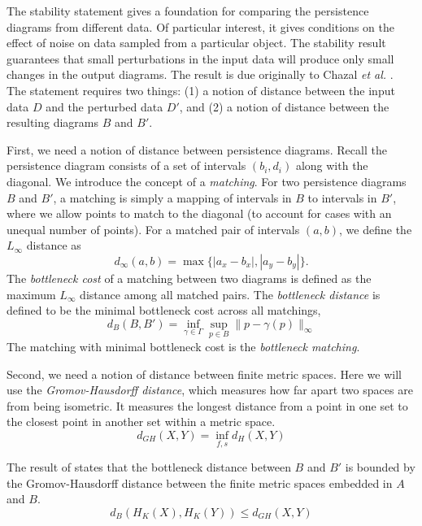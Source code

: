The stability statement gives a foundation for comparing the persistence diagrams from different data.
Of particular interest, it gives conditions on the effect of noise on data sampled from a particular object.
The stability result guarantees that small perturbations in the input data will produce only small changes in the output diagrams.
The result is due originally to Chazal \emph{et al.} \cite{Chazal:2009wc}.
The statement requires two things: (1) a notion of distance between the input data $D$ and the perturbed data $D'$, and (2) a notion of distance between the resulting diagrams $B$ and $B'$.

First, we need a notion of distance between persistence diagrams.
Recall the persistence diagram consists of a set of intervals $(b_i,d_i)$ along with the diagonal.
We introduce the concept of a \emph{matching}.
For two persistence diagrams $B$ and $B'$, a matching is simply a mapping of intervals in $B$ to intervals in $B'$, where we allow points to match to the diagonal (to account for cases with an unequal number of points).
For a matched pair of intervals $(a,b)$, we define the $L_{\infty}$ distance as
\begin{equation}
d_{\infty}(a,b) = \max\{ |a_{x}-b_{x}|, |a_{y}-b_{y}| \}.
\end{equation}
The \emph{bottleneck cost} of a matching between two diagrams is defined as the maximum $L_{\infty}$ distance among all matched pairs.
The \emph{bottleneck distance} is defined to be the minimal bottleneck cost across all matchings,
\begin{equation}
d_{B}(B,B') = \inf_{\gamma\in\Gamma}\sup_{p\in B}\|p-\gamma(p)\|_{\infty}
\end{equation}
The matching with minimal bottleneck cost is the \emph{bottleneck matching}.

Second, we need a notion of distance between finite metric spaces.
Here we will use the \emph{Gromov-Hausdorff distance}, which measures how far apart two spaces are from being isometric.
It measures the longest distance from a point in one set to the closest point in another set within a metric space.
\begin{equation}
d_{GH}(X,Y)=\inf_{f,s} d_H(X,Y)
\end{equation}

The result of \cite{Chazal:2009wc} states that the bottleneck distance between $B$ and $B'$ is bounded by the Gromov-Hausdorff distance between the finite metric spaces embedded in $A$ and $B$.
\begin{equation}
d_{B}(H_{K}(X),H_{K}(Y)) \leq d_{GH}(X,Y)
\end{equation}


